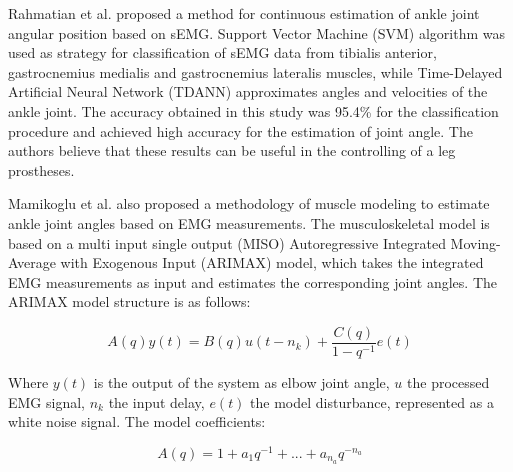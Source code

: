 \documentclass[letterpaper, 10 pt, conference]{ieeeconf}  %
\begin{document}
Rahmatian et al. \cite{Rahmatian2016158} proposed a method for continuous estimation of ankle joint angular position based on sEMG. Support Vector Machine (SVM) algorithm was used as strategy for classification of sEMG data from tibialis anterior, gastrocnemius medialis and gastrocnemius lateralis muscles, while Time-Delayed Artificial Neural Network (TDANN) approximates angles and velocities of the ankle joint. The accuracy obtained in this study was 95.4\% for the classification procedure and achieved high accuracy for the estimation of joint angle. The authors believe that these results can be useful in the controlling of a leg prostheses.


Mamikoglu et al. \cite{Mamikoglu2016785} also proposed a methodology of muscle modeling to estimate ankle joint angles based on EMG measurements. The musculoskeletal model is based on a multi input single output (MISO) Autoregressive Integrated Moving-Average with Exogenous Input (ARIMAX) model, which takes the integrated EMG measurements as input and estimates the corresponding joint angles. The ARIMAX model structure is as follows:

\begin{equation}
\label{eq:ARIMAX}
A(q)y(t) = B(q)u(t-n_k)+\frac{C(q)}{1-q^{-1}}e(t)
\end{equation}

Where \(y(t)\) is the output of the system as elbow joint angle, \(u\) the processed EMG signal, \(n_k\) the input delay, \(e(t)\) the model disturbance, represented as a white noise signal. The model coefficients:

\begin{equation}
\label{eq:A}
A(q) = 1 + a_1q^{-1}+...+a_{n_a}q^{-n_a}
\end{equation}
\end{document}
